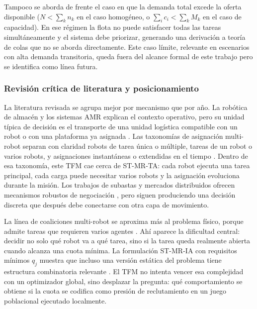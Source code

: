Tampoco se aborda de frente el caso en que la demanda total excede la oferta disponible
($N < \sum_k n_k$ en el caso homogéneo, o $\sum_i c_i < \sum_k M_k$ en el caso de
capacidad). En ese régimen la flota no puede satisfacer todas las tareas
simultáneamente y el sistema debe priorizar, generando una derivación a teoría de colas que no se aborda directamente. Este caso límite, relevante en escenarios
con alta demanda transitoria, queda fuera del alcance formal de este trabajo pero se
identifica como línea futura.

\subsubsection{Revisión crítica de literatura y posicionamiento}
\label{subsec:revision_critica}

La literatura revisada se agrupa mejor por mecanismo que por año. La robótica de
almacén y los sistemas AMR explican el contexto operativo, pero su unidad típica de
decisión es el transporte de una unidad logística compatible con un robot o con una
plataforma ya asignada \citep{leanh2006agv,wurman2008coordinating,azadeh2019warehouse,
keith2024amrwarehouse}. Las taxonomías de asignación multi-robot separan con claridad
robots de tarea única o múltiple, tareas de un robot o varios robots, y asignaciones
instantáneas o extendidas en el tiempo \citep{gerkey2004formal,korsah2013taxonomy}.
Dentro de esa taxonomía, este TFM cae cerca de ST-MR-TA: cada robot ejecuta una tarea
principal, cada carga puede necesitar varios robots y la asignación evoluciona durante la
misión. Los trabajos de subastas y mercados distribuidos ofrecen mecanismos robustos de
negociación \citep{dias2006market,choi2009consensus}, pero siguen produciendo una
decisión discreta que después debe conectarse con otra capa de movimiento.

La línea de coaliciones multi-robot se aproxima más al problema físico, porque admite
tareas que requieren varios agentes \citep{dutta2021hedonic,zhang2024coalition,
shan2024distributed}. Ahí aparece la dificultad central: decidir no solo qué robot va a
qué tarea, sino si la tarea queda realmente abierta cuando alcanza una cuota mínima. La
formulación ST-MR-IA con requisitos mínimos $q_j$ muestra que incluso una versión
estática del problema tiene estructura combinatoria relevante \citep{aziz2021complexity}.
El TFM no intenta vencer esa complejidad con un optimizador global, sino desplazar la
pregunta: qué comportamiento se obtiene si la cuota se codifica como presión de
reclutamiento en un juego poblacional ejecutado localmente.

